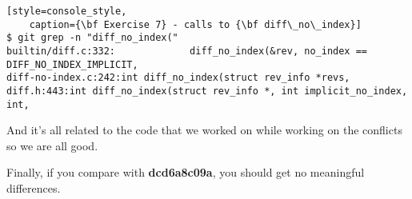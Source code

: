 \begin{lstlisting}[style=console_style,
	caption={\bf Exercise 7} - calls to {\bf diff\_no\_index}]
$ git grep -n "diff_no_index("
builtin/diff.c:332:             diff_no_index(&rev, no_index == DIFF_NO_INDEX_IMPLICIT, 
diff-no-index.c:242:int diff_no_index(struct rev_info *revs,
diff.h:443:int diff_no_index(struct rev_info *, int implicit_no_index, int,
\end{lstlisting}

And it's all related to the code that we worked on while working on the conflicts so we are all good.

Finally, if you compare with {\bf dcd6a8c09a}, you should get no meaningful differences.

